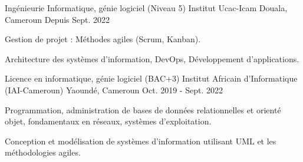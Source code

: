 

\begin{cventries}

  \cventry
    {Ingénieurie Informatique, génie logiciel
(Niveau 5)} %
    {Institut Ucac-Icam} %
    {Douala, Cameroun} %
    {Depuis Sept. 2022} %
    {
      \begin{cvitems} %
        \item {Gestion de projet : Méthodes agiles (Scrum, Kanban).}
        \item {Architecture des systèmes d’information, DevOps, Développement d’applications.}
      \end{cvitems}
    }


  \cventry
    {Licence en informatique, génie logiciel
(BAC+3)} %
    {Institut Africain d'Informatique (IAI-Cameroun)} %
    {Yaoundé, Cameroun} %
    {Oct. 2019 - Sept. 2022} %
    {
      \begin{cvitems} %
        \item {Programmation, administration de bases de données relationnelles et orienté objet, fondamentaux en réseaux, systèmes d'exploitation. }
        \item {Conception et modélisation de systèmes d'information utilisant UML et les méthodologies agiles.}
      \end{cvitems}
    }

\end{cventries}
